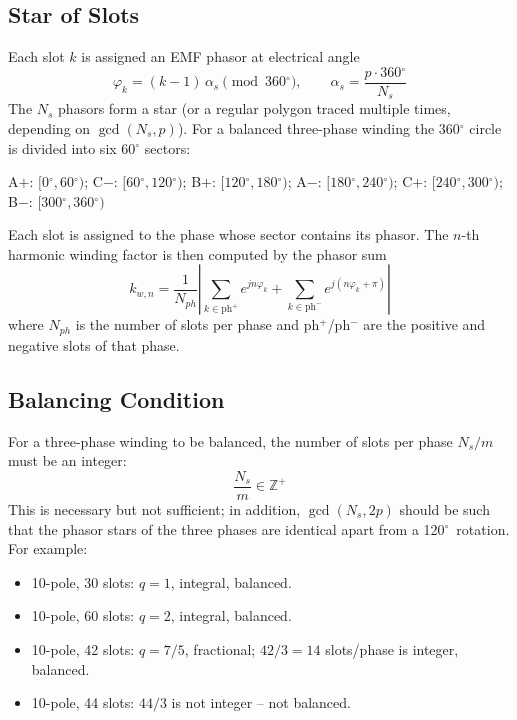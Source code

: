\documentclass[12pt,a4paper]{article}
\newcommand{\degree}{\ensuremath{^{\circ}}}
\begin{document}
\subsection{Star of Slots}

Each slot $k$ is assigned an EMF phasor at electrical angle
\begin{equation}
  \varphi_k = (k-1)\,\alpha_s \pmod{360\degree},
  \qquad
  \alpha_s = \frac{p\cdot 360\degree}{N_s}
  \label{eq:star_of_slots}
\end{equation}
The $N_s$ phasors form a star (or a regular polygon traced multiple
times, depending on $\gcd(N_s,p)$).
For a balanced three-phase winding the $360\degree$ circle is divided
into six $60\degree$ sectors:
\begin{center}
  A$+$: $[0\degree,60\degree)$;\quad
  C$-$: $[60\degree,120\degree)$;\quad
  B$+$: $[120\degree,180\degree)$;\quad
  A$-$: $[180\degree,240\degree)$;\quad
  C$+$: $[240\degree,300\degree)$;\quad
  B$-$: $[300\degree,360\degree)$
\end{center}
Each slot is assigned to the phase whose sector contains its phasor.
The $n$-th harmonic winding factor is then computed by the
phasor sum
\begin{equation}
  k_{w,n} = \frac{1}{N_{ph}}
  \left|\sum_{k\in\text{ph}^+} e^{jn\varphi_k}
        + \sum_{k\in\text{ph}^-} e^{j(n\varphi_k + \pi)}\right|
\end{equation}
where $N_{ph}$ is the number of slots per phase and ph$^+$/ph$^-$ are
the positive and negative slots of that phase.

\subsection{Balancing Condition}

For a three-phase winding to be balanced, the number of slots per
phase $N_s/m$ must be an integer:
\begin{equation}
  \frac{N_s}{m} \in \mathbb{Z}^+
  \label{eq:balance}
\end{equation}
This is necessary but not sufficient; in addition,
$\gcd(N_s, 2p)$ should be such that the phasor stars of the three
phases are identical apart from a 120\degree\ rotation.
For example:
\begin{itemize}[noitemsep]
  \item 10-pole, 30 slots: $q=1$, integral, balanced.
  \item 10-pole, 60 slots: $q=2$, integral, balanced.
  \item 10-pole, 42 slots: $q=7/5$, fractional;
        $42/3 = 14$ slots/phase is integer, balanced.
  \item 10-pole, 44 slots: $44/3$ is not integer -- not balanced.
\end{itemize}
\end{document}
